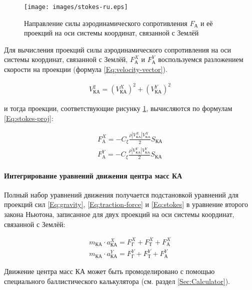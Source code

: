 \documentclass[12pt,a4paper]{article}
\begin{document}
\begin{figure}[tbh]
  \begin{center}
    \texttt{[image: images/stokes-ru.eps]}
    \caption{Направление силы аэродинамического сопротивления $F_{\text{А}}$ и её проекций
      на оси системы координат, связанной с Землёй}
    \label{Pic:Stokes}
  \end{center}
\end{figure}

Для вычисления проекций силы аэродинамического сопротивления на оси системы координат, связанной с
Землёй, $F_{\text{А}}^X$ и $F_{\text{А}}^Y$ воспользуемся разложением скорости на проекции
(формула \ref{Eq:velocity-vector}).

\begin{eqnarray}
  V_{\text{КА}}^2 = \left( V_{\text{КА}}^X \right)^2 + \left( V_{\text{КА}}^Y \right)^2
  \label{Eq:velocity-vector}
\end{eqnarray}

и тогда проекции, соответствующие рисунку \ref{Pic:Stokes}, вычисляются по формулам
\ref{Eq:stokes-proj}:

\begin{eqnarray}
  F_{\text{A}}^X = - C_\xi \frac{\rho \left| V_{\text{КА}}^X \right| V_{\text{КА}}^X}{2} S_{\text{КА}} \nonumber \\
  F_{\text{A}}^Y = - C_\xi \frac{\rho \left| V_{\text{КА}}^Y \right| V_{\text{КА}}^Y}{2} S_{\text{КА}} \label{Eq:stokes-proj}
\end{eqnarray}

\paragraph{Интегрирование уравнений движения центра масс КА}

Полный набор уравнений движения получается подстановкой уравнений для проекций сил
\ref{Eq:gravity}, \ref{Eq:traction-force} и \ref{Eq:stokes} в уравнение второго закона
Ньютона, записанное для двух проекций на оси системы координат, связанной с Землёй:

\begin{eqnarray}
  m_{\text{КА}} \cdot a_{\text{КА}}^X = F_{\text{Г}}^X + F_{\text{Т}}^X + F_{\text{А}}^X
  \nonumber \\
  m_{\text{КА}} \cdot a_{\text{КА}}^Y = F_{\text{Г}}^Y + F_{\text{Т}}^Y + F_{\text{А}}^Y
\end{eqnarray}

Движение центра масс КА может быть промоделировано с помощью специального баллистического
калькулятора (см. раздел \ref{Sec:Calculator}).
\end{document}
